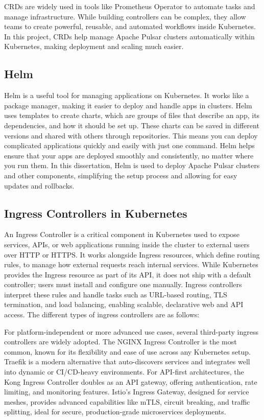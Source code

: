 CRDs are widely used in tools like Prometheus Operator to automate tasks and manage infrastructure. While building controllers can be complex, they allow teams to create powerful, reusable, and automated workflows inside Kubernetes. In this project, CRDs help manage Apache Pulsar clusters automatically within Kubernetes, making deployment and scaling much easier.

\subsection{Helm}
Helm is a useful tool for managing applications on Kubernetes. It works like a package manager, making it easier to deploy and handle apps in clusters. Helm uses templates to create charts, which are groups of files that describe an app, its dependencies, and how it should be set up.
These charts can be saved in different versions and shared with others through repositories. This means you can deploy complicated applications quickly and easily with just one command. Helm helps ensure that your apps are deployed smoothly and consistently, no matter where you run them. In this dissertation, Helm is used to deploy Apache Pulsar clusters and other components, simplifying the setup process and allowing for easy updates and rollbacks.

\subsection{Ingress Controllers in Kubernetes}
An Ingress Controller is a critical component in Kubernetes used to expose services, APIs, or web applications running inside the cluster to external users over HTTP or HTTPS. It works alongside Ingress resources, which define routing rules, to manage how external requests reach internal services. While Kubernetes provides the Ingress resource as part of its API, it does not ship with a default controller; users must install and configure one manually. Ingress controllers interpret these rules and handle tasks such as URL-based routing, TLS termination, and load balancing, enabling scalable, declarative web and API access. The different types of ingress controllers are as follows:


For platform-independent or more advanced use cases, several third-party ingress controllers are widely adopted. The NGINX Ingress Controller is the most common, known for its flexibility and ease of use across any Kubernetes setup. Traefik is a modern alternative that auto-discovers services and integrates well into dynamic or CI/CD-heavy environments. For API-first architectures, the Kong Ingress Controller doubles as an API gateway, offering authentication, rate limiting, and monitoring features. Istio's Ingress Gateway, designed for service meshes, provides advanced capabilities like mTLS, circuit breaking, and traffic splitting, ideal for secure, production-grade microservices deployments.

